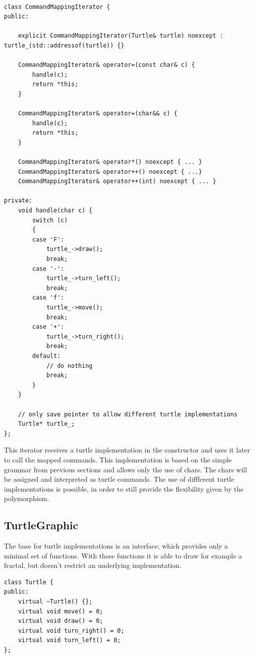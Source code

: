 \documentclass[english]{cpp-hmwk}
\begin{document}
\medskip
\begin{lstlisting}

class CommandMappingIterator {
public:

    explicit CommandMappingIterator(Turtle& turtle) noexcept : turtle_(std::addressof(turtle)) {}

    CommandMappingIterator& operator=(const char& c) {
        handle(c);
        return *this;
    }

    CommandMappingIterator& operator=(char&& c) {
        handle(c);
        return *this;
    }

    CommandMappingIterator& operator*() noexcept { ... }
    CommandMappingIterator& operator++() noexcept { ...}
    CommandMappingIterator& operator++(int) noexcept { ... }

private:
    void handle(char c) {
        switch (c)
        {
        case 'F':
            turtle_->draw();
            break;
        case '-':
            turtle_->turn_left();
            break;
        case 'f':
            turtle_->move();
            break;
        case '+':
            turtle_->turn_right();
            break;
        default:
            // do nothing
            break;
        }
    }

    // only save pointer to allow different turtle implementations
    Turtle* turtle_;
};

\end{lstlisting}

\noindent This iterator receives a turtle implementation in the constructor and uses it later to call the mapped commands. This implementation is based on the simple grammar from previous sections and allows only the use of chars. The chars will be assigned and interpreted as turtle commands. The use of diffferent turtle implementations is possible, in order to still provide the flexibility given by the polymorphism.

\subsection{TurtleGraphic}

The base for turtle implementations is an interface, which provides only a minimal set of functions. With these functions it is able to draw for example a fractal, but doesn't restrict an underlying implementation.

\medskip
\begin{lstlisting}
class Turtle {
public:
    virtual ~Turtle() {};
    virtual void move() = 0;
    virtual void draw() = 0;
    virtual void turn_right() = 0;
    virtual void turn_left() = 0;
};
\end{lstlisting}
\end{document}
